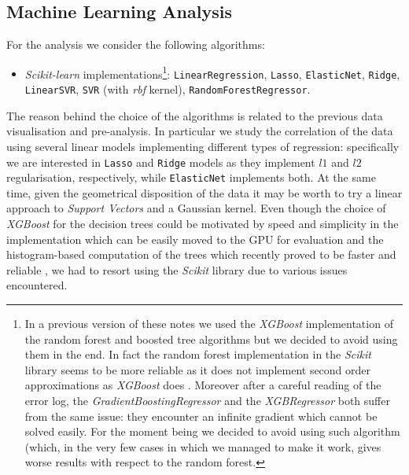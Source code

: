 \subsection{Machine Learning Analysis}
    For the analysis we consider the following algorithms:
    \begin{itemize}
        \item \textit{Scikit-learn} implementations\footnote{In a previous version of these notes we used the \textit{XGBoost} implementation of the random forest and boosted tree algorithms but we decided to avoid using them in the end. In fact the random forest implementation in the \textit{Scikit} library seems to be more reliable as it does not implement second order approximations as \textit{XGBoost} does \cite[documentation of]{Chen:2016:XST:2939672.2939785}. Moreover after a careful reading of the error log, the \textit{GradientBoostingRegressor} and the \textit{XGBRegressor} both suffer from the same issue: they encounter an infinite gradient which cannot be solved easily. For the moment being we decided to avoid using such algorithm (which, in the very few cases in which we managed to make it work, gives worse results with respect to the random forest.}:
            \subitem \texttt{LinearRegression},
            \subitem \texttt{Lasso},
            \subitem \texttt{ElasticNet},
            \subitem \texttt{Ridge},
            \subitem \texttt{LinearSVR},
            \subitem \texttt{SVR} (with \textit{rbf} kernel),
            \subitem \texttt{RandomForestRegressor}.
    \end{itemize}
    The reason behind the choice of the algorithms is related to the previous data visualisation and pre-analysis. In particular we study the correlation of the data using several linear models implementing different types of regression: specifically we are interested in \texttt{Lasso} and \texttt{Ridge} models as they implement $l1$ and $l2$ regularisation, respectively, while \texttt{ElasticNet} implements both. At the same time, given the geometrical disposition of the data it may be worth to try a linear approach to \textit{Support Vectors} and a Gaussian kernel. Even though the choice of \textit{XGBoost} for the decision trees could be motivated by speed and simplicity in the implementation which can be easily moved to the GPU for evaluation and the histogram-based computation of the trees which recently proved to be faster and reliable \cite{ke2017lightgbm}, we had to resort using the \textit{Scikit} library due to various issues encountered.

